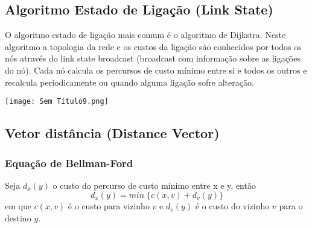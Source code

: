 \documentclass[10pt,a4paper]{report}
\begin{document}
\subsection{Algoritmo Estado de Ligação (Link State)}
\begin{minipage}[c]{0.7\linewidth}
O algoritmo estado de ligação mais comum é o algoritmo de Dijkstra. Neste algoritmo a topologia da rede e os custos da ligação são conhecidos por todos os nós através do link state broadcast (broadcast com informação sobre as ligações do nó). Cada nó calcula os percursos de custo mínimo entre si e todos os outros e recalcula periodicamente ou quando alguma ligação sofre alteração.
\end{minipage}
\begin{minipage}[c]{0.35\linewidth}
\texttt{[image: Sem Título9.png]}
\end{minipage}
\subsection{Vetor distância (Distance Vector)}
\subsubsection{Equação de Bellman-Ford}
Seja $d_x(y)$ o custo do percurso de custo mínimo entre x e y, então
$$
d_x(y) = min\;\{c(x,v) + d_v(y)\}
$$
em que $c(x,v)$ é o custo para vizinho $v$ e $d_v(y)$ é o custo do vizinho $v$ para o destino $y$.
\end{document}
